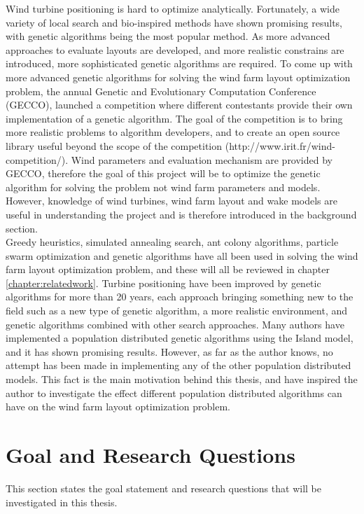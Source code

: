\noindent Wind turbine positioning is hard to optimize analytically. Fortunately, a wide variety of local search and bio-inspired methods have shown promising results, with genetic algorithms being the most popular method. As more advanced approaches to evaluate layouts are developed, and more realistic constrains are introduced, more sophisticated genetic algorithms are required. To come up with more advanced genetic algorithms for solving the wind farm layout optimization problem, the annual Genetic and Evolutionary Computation Conference (GECCO), launched a competition where different contestants provide their own implementation of a genetic algorithm. The goal of the competition is to bring more realistic problems to algorithm developers, and to create an open source library useful beyond the scope of the competition (http://www.irit.fr/wind-competition/). Wind parameters and evaluation mechanism are provided by GECCO, therefore the goal of this project will be to optimize the genetic algorithm for solving the problem not wind farm parameters and models. However, knowledge of wind turbines, wind farm layout and wake models are useful in understanding the project and is therefore introduced in the background section. \\

\noindent Greedy heuristics, simulated annealing search, ant colony algorithms, particle swarm optimization and genetic algorithms have all been used in solving the wind farm layout optimization problem, and these will all be reviewed in chapter \ref{chapter:relatedwork}. Turbine positioning have been improved by genetic algorithms for more than 20 years, each approach bringing something new to the field such as a new type of genetic algorithm, a more realistic environment, and genetic algorithms combined with other search approaches. Many authors have implemented a population distributed genetic algorithms using the Island model, and it has shown promising results. However, as far as the author knows, no attempt has been made in implementing any of the other population distributed models. This fact is the main motivation behind this thesis, and have inspired the author to investigate the effect different population distributed algorithms can have on the wind farm layout optimization problem. 


\section{Goal and Research Questions}\label{section:goal&researchquestions}
This section states the goal statement and research questions that will be investigated in this thesis. \\

